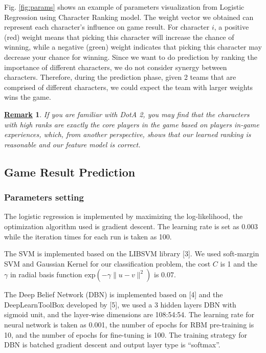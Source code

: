 \documentclass{article} %
\newtheorem{remark}{\underline{Remark}}
\begin{document}
Fig. \ref{fig:params} shows an example of parameters visualization from Logistic Regression using Character Ranking model. The weight vector we obtained can represent each character's influence on game result. For character $i$, a positive (red) weight means that picking this character will increase the chance of winning, while a negative (green) weight indicates that picking this character may decrease your chance for winning. Since we want to do prediction by ranking the importance of different characters, we do not consider synergy between characters. Therefore, during the prediction phase, given 2 teams that are comprised of different characters, we could expect the team with larger weights wins the game.

\begin{remark}
If you are familiar with DotA 2, you may find that the characters with high ranks are exactly the core players in the game based on players in-game experiences, which, from another perspective, shows that our learned ranking is reasonable and our feature model is correct.
\end{remark}




\subsection{Game Result Prediction}

\subsubsection{Parameters setting}

The logistic regression is implemented by maximizing the log-likelihood, the optimization algorithm used is gradient descent. The learning rate is set as 0.003 while the iteration times for each run is taken as 100.

The SVM is implemented based on the LIBSVM library [3]. We used soft-margin SVM and Gaussian Kernel for our classification problem, the cost $C$ is 1 and the $\gamma$ in radial basis function $\text{exp}(-\gamma \|u-v\|^2)$ is 0.07.

The Deep Belief Network (DBN) is implemented based on [4] and the DeepLearnToolBox developed by [5], we used a 3 hidden layers DBN with sigmoid unit, and the layer-wise dimensions are 108:54:54. The learning rate for neural network is taken as 0.001, the number of epochs for RBM pre-training is 10, and the number of epochs for fine-tuning is 100. The training strategy for DBN is batched gradient descent and output layer type is ``softmax''.
\end{document}
